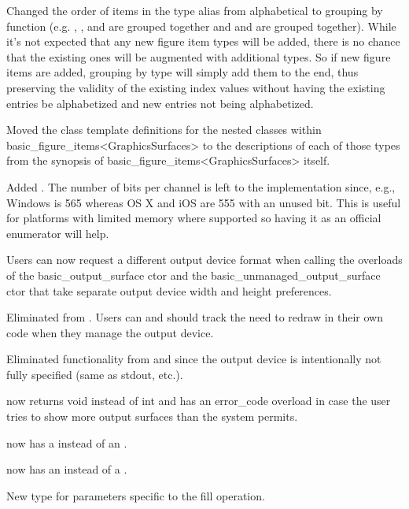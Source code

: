 \pnum
Changed the order of items in the  type alias from alphabetical to grouping by function (e.g. , , and  are grouped together and  and  are grouped together). While it's not expected that any new figure item types will be added, there is no chance that the existing ones will be augmented with additional types. So if new figure items are added, grouping by type will simply add them to the end, thus preserving the validity of the existing index values without having the existing entries be alphabetized and new entries not being alphabetized.

\pnum
Moved the class template definitions for the nested classes within basic_figure_items<GraphicsSurfaces> to the descriptions of each of those types from the synopsis of basic_figure_items<GraphicsSurfaces> itself.

\pnum
Added . The number of bits per channel is left to the implementation since, e.g., Windows\textregistered{} is 565 whereas OS X\textregistered{} and iOS\textregistered{} are 555 with an unused bit. This is useful for platforms with limited memory where supported so having it as an official enumerator will help. 

\pnum
Users can now request a different output device format when calling the overloads of the basic_output_surface ctor and the basic_unmanaged_output_surface ctor that take separate output device width and height preferences.

\pnum
Eliminated  from . Users can and should track the need to redraw in their own code when they manage the output device.

\pnum
Eliminated  functionality from  and  since the output device is intentionally not fully specified (same as stdout, etc.).

\pnum
{} now returns void instead of int and has an error_code overload in case the user tries to show more output surfaces than the system permits.

\pnum
{} now has a  instead of an .

\pnum
{} now has an  instead of a .

\pnum
New type  for parameters specific to the fill operation.

